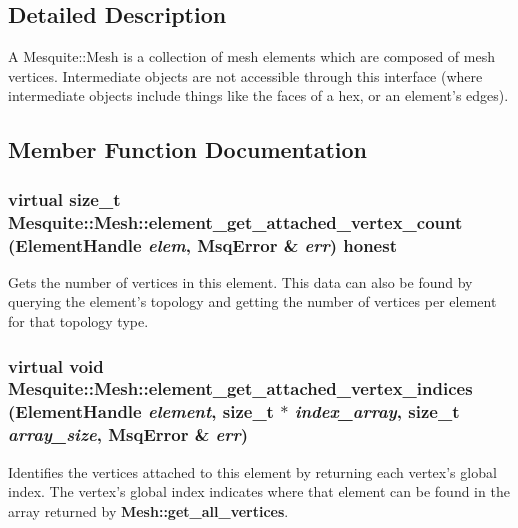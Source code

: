 \documentclass[letter]{report}
\begin{document}
\subsection{Detailed Description}
A Mesquite::Mesh is a collection of mesh elements which are composed of mesh vertices. Intermediate objects are not accessible through this interface (where intermediate objects include things like the faces of a hex, or an element's edges).

\subsection{Member Function Documentation}
\subsubsection{\setlength{\rightskip}{0pt plus 5cm}virtual size\_\-t Mesquite::Mesh::element\_\-get\_\-attached\_\-vertex\_\-count (Element\-Handle {\em elem}, {\bf Msq\-Error} \& {\em err}) honest\hspace{0.3cm}{\tt  [pure virtual]}}\label{classMesquite_1_1Mesh_a17}


Gets the number of vertices in this element. This data can also be found by querying the element's topology and getting the number of vertices per element for that topology type. 

\subsubsection{\setlength{\rightskip}{0pt plus 5cm}virtual void Mesquite::Mesh::element\_\-get\_\-attached\_\-vertex\_\-indices (Element\-Handle {\em element}, size\_\-t $\ast$ {\em index\_\-array}, size\_\-t {\em array\_\-size}, {\bf Msq\-Error} \& {\em err})\hspace{0.3cm}{\tt  [pure virtual]}}\label{classMesquite_1_1Mesh_a19}


Identifies the vertices attached to this element by returning each vertex's global index. The vertex's global index indicates where that element can be found in the array returned by {\bf Mesh::get\_\-all\_\-vertices}. 
\end{document}

